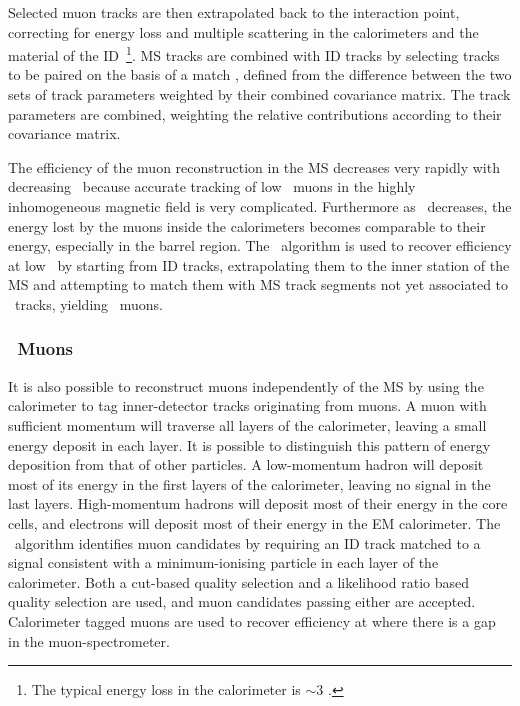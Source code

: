 Selected muon tracks are then extrapolated back to the interaction point,
correcting for energy loss and multiple scattering in the calorimeters and the
material of the ID~\footnote{The typical energy loss in the calorimeter is $\sim
3$ \GeV.}. MS tracks are combined with ID tracks by selecting tracks to be
paired on the basis of a match \chisquared, defined from the difference between
the two sets of track parameters weighted by their combined covariance matrix.
The track parameters are combined, weighting the relative contributions
according to their covariance matrix.

The efficiency of the muon reconstruction in the MS decreases very rapidly with
decreasing \pt\ because accurate tracking of low \pt\ muons in the highly
inhomogeneous magnetic field is very complicated.
Furthermore as \pt\ decreases, the energy lost by the muons inside the
calorimeters becomes comparable to their energy, especially in the barrel
region. The \mutag\ algorithm is used to recover efficiency at low \pt\ by
starting from ID tracks, extrapolating them to the inner station of the MS and
attempting to match them with MS track segments not yet associated to \combined\
tracks, yielding \segmentTagged\ muons.

\subsubsection{\caloTagged\ Muons}

It is also possible to reconstruct muons independently of the MS by using the
calorimeter to tag inner-detector tracks originating from muons.  A muon with
sufficient momentum will traverse all layers of the calorimeter, leaving a small
energy deposit in each layer. It is possible to distinguish this pattern of
energy deposition from that of other particles. A low-momentum hadron will
deposit most of its energy in the first layers of the calorimeter, leaving no
signal in the last layers. High-momentum hadrons will deposit most of their
energy in the core cells, and electrons will deposit most of their energy in the
EM calorimeter. The \CaloTrkMuID\ algorithm identifies muon candidates by
requiring an ID track matched to a signal consistent with a
minimum-ionising particle in each layer of the calorimeter. 
Both a cut-based quality selection and a likelihood ratio based quality
selection are used, and muon candidates passing either are accepted. Calorimeter
tagged muons are used to recover efficiency at \modetalt{0.1} where there is a
gap in the muon-spectrometer.

